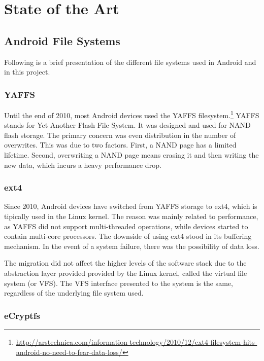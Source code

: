\chapter{State of the Art}
\label{chapter:state}

\section{Android File Systems}
\label{sec:android-filesys}

Following is a brief presentation of the different file systems used in Android and in this project.

\subsection{YAFFS}
\label{sub-sec:yaffs}

Until the end of 2010, most Android devices used the YAFFS filesystem.\footnote{\url{http://arstechnica.com/information-technology/2010/12/ext4-filesystem-hits-android-no-need-to-fear-data-loss/}}
YAFFS stands for Yet Another Flash File System. It was designed and used for NAND flash storage. The primary concern was even distribution in the number of overwrites. This was due to two factors. First, a NAND page has a limited lifetime. Second, overwriting a NAND page means erasing it and then writing the new data, which incurs a heavy performance drop.

\subsection{ext4}
\label{sub-sec:ext4}

Since 2010, Android devices have switched from YAFFS storage to ext4, which is tipically used in the Linux kernel. The reason was mainly related to performance, as YAFFS did not support multi-threaded operations, while devices started to contain multi-core processors.
The downside of using ext4 stood in its buffering mechanism. In the event of a system failure, there was the possibility of data loss.

The migration did not affect the higher levels of the software stack due to the abstraction layer provided provided by the Linux kernel, called the virtual file system (or VFS). The VFS interface presented to the system is the same, regardless of the underlying file system used.

\subsection{eCryptfs}
\label{sub-sec:sa-ecryptfs}


